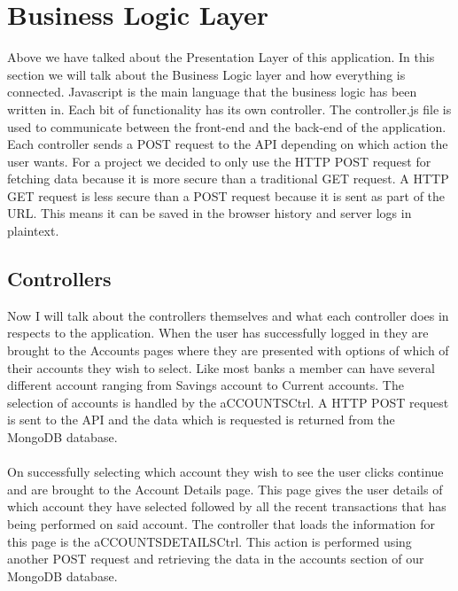 \section{Business Logic Layer}
Above we have talked about the Presentation Layer of this application. In this section we will talk about the Business Logic layer and how everything is connected. Javascript is the main language that the business logic has been written in. Each bit of functionality has its own controller. The controller.js file is used to communicate between the front-end and the back-end of the application.  Each controller sends a POST request to the API depending on which action the user wants. For a project we decided to only use the HTTP POST request for fetching data because it is more secure than a traditional GET request. A HTTP GET request is less secure than a POST request because it is sent as part of the URL. This means it can be saved in the browser history and server logs in plaintext.\cite{http}

\subsection{Controllers}
Now I will talk about the controllers themselves and what each controller does in respects to the application. When the user has successfully logged in they are brought to the Accounts pages where they are presented with options of which of their accounts they wish to select. Like most banks a member can have several different account ranging from Savings account to Current accounts.  The selection of accounts is handled by the aCCOUNTSCtrl. A HTTP POST request is sent to the API and the data which is requested is returned from the MongoDB database.\paragraph{}

On successfully selecting which account they wish to see the user clicks continue and are brought to the Account Details page. This page gives the user details of which account they have selected followed by all the recent transactions that has being performed on said account. The controller that loads the information for this page is the aCCOUNTSDETAILSCtrl. This action is performed using another POST request and retrieving the data in the accounts section of our MongoDB database.\paragraph{}

